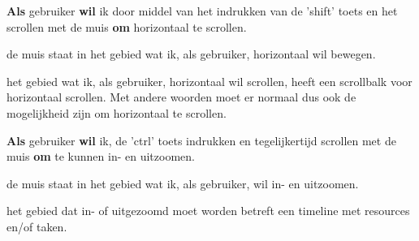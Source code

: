 \nextUserStory
\textbf{Als} gebruiker \textbf{wil} ik door middel van het indrukken van de 'shift' toets en het scrollen met de muis \textbf{om} horizontaal te scrollen. 
\beginGegeven
    \item de muis staat in het gebied wat ik, als gebruiker, horizontaal wil bewegen.
    \item het gebied wat ik, als gebruiker, horizontaal wil scrollen, heeft een scrollbalk voor horizontaal scrollen. Met andere woorden moet er normaal dus ook de mogelijkheid zijn om horizontaal te scrollen.
\endGegeven

\nextUserStory
\textbf{Als} gebruiker \textbf{wil} ik, de 'ctrl' toets indrukken en tegelijkertijd scrollen met de muis \textbf{om} te kunnen in- en uitzoomen. 
\beginGegeven
    \item de muis staat in het gebied wat ik, als gebruiker, wil in- en uitzoomen. 
    \item het gebied dat in- of uitgezoomd moet worden betreft een timeline met resources en/of taken.
\endGegeven

